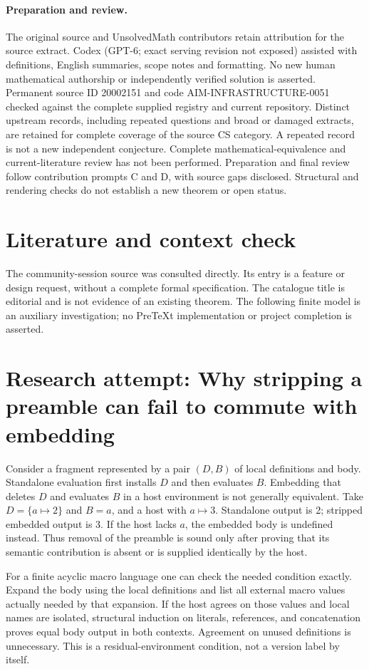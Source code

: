 \documentclass[11pt]{article}
\begin{document}
\paragraph{Preparation and review.}
The original source and UnsolvedMath contributors retain attribution for the source extract. Codex (GPT-6; exact serving revision not exposed) assisted with definitions, English summaries, scope notes and formatting. No new human mathematical authorship or independently verified solution is asserted. Permanent source ID 20002151 and code AIM-INFRASTRUCTURE-0051 checked against the complete supplied registry and current repository. Distinct upstream records, including repeated questions and broad or damaged extracts, are retained for complete coverage of the source CS category. A repeated record is not a new independent conjecture. Complete mathematical-equivalence and current-literature review has not been performed. Preparation and final review follow contribution prompts C and D, with source gaps disclosed. Structural and rendering checks do not establish a new theorem or open status.
\label{end:20002151}

\section{Literature and context check}
The community-session source was consulted directly. Its entry is a feature or design request, without a complete formal specification. The catalogue title is editorial and is not evidence of an existing theorem. The following finite model is an auxiliary investigation; no PreTeXt implementation or project completion is asserted.
\section{Research attempt: Why stripping a preamble can fail to commute with embedding}
Consider a fragment represented by a pair $(D,B)$ of local definitions and body. Standalone evaluation first installs $D$ and then evaluates $B$. Embedding that deletes $D$ and evaluates $B$ in a host environment is not generally equivalent. Take $D=\{a\mapsto2\}$ and $B=a$, and a host with $a\mapsto3$. Standalone output is 2; stripped embedded output is 3. If the host lacks $a$, the embedded body is undefined instead. Thus removal of the preamble is sound only after proving that its semantic contribution is absent or is supplied identically by the host.

For a finite acyclic macro language one can check the needed condition exactly. Expand the body using the local definitions and list all external macro values actually needed by that expansion. If the host agrees on those values and local names are isolated, structural induction on literals, references, and concatenation proves equal body output in both contexts. Agreement on unused definitions is unnecessary. This is a residual-environment condition, not a version label by itself.
\end{document}
